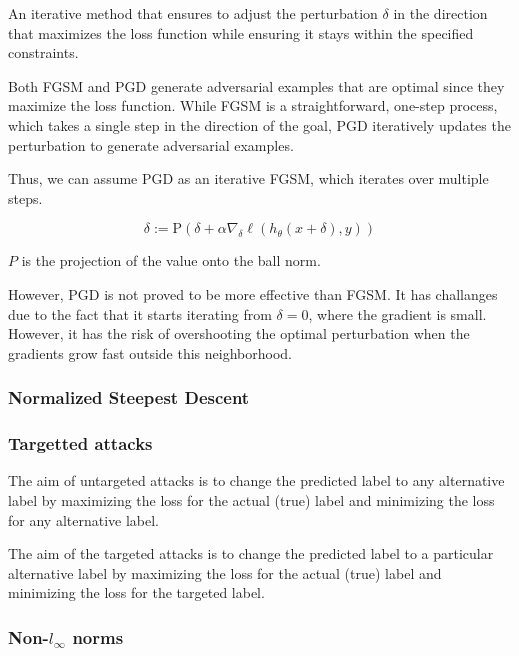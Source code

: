An iterative method that ensures to adjust the perturbation $\delta$ in the direction that maximizes the loss function 
while ensuring it stays within the specified constraints.

Both FGSM and PGD generate adversarial examples that are optimal since they maximize the loss function.
While FGSM is a straightforward, one-step process, which takes a single step in the direction of the goal,
PGD iteratively updates the perturbation to generate adversarial examples. 

Thus, we can assume PGD as an iterative FGSM, which iterates over multiple steps.

\[\delta := \text{P}(\delta + \alpha \nabla_{\delta} \ell(h_\theta(x + \delta), y))\]

$P$ is the projection of the value onto the ball norm.

However, PGD is not proved to be more effective than FGSM. It has challanges due to the fact that it starts iterating 
from $\delta = 0$, where the gradient is small. However, it has the risk of overshooting the optimal 
perturbation when the gradients grow fast outside this neighborhood. 


\subsubsection{Normalized Steepest Descent}

\subsubsection{Targetted attacks}

The aim of untargeted attacks is to change the predicted label to any alternative label 
by maximizing the loss for the actual (true) label and minimizing the loss for any alternative label. 

The aim of the targeted attacks is to change the predicted label to a particular alternative label 
by maximizing the loss for the actual (true) label and minimizing the loss for the targeted label. 


\subsubsection{Non-$l_{\infty}$ norms}


